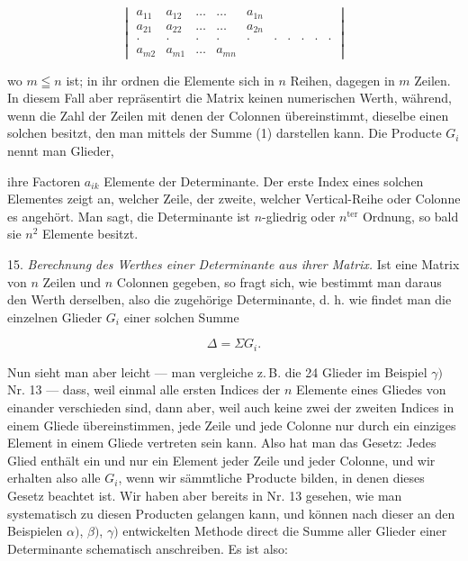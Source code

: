 \documentclass[11pt]{article}
\providecommand{\weberpage}[1]{}
\providecommand{\weq}[2]{\begin{equation}\tag{#1}#2\end{equation}}
\let\Delta\varDelta
\let\Sigma\varSigma
\begin{document}
\[
\begin{vmatrix} a_{11} & a_{12} & \ldots & \ldots & a_{1n} \\ a_{21} & a_{22} & \ldots & \ldots & a_{2n} \\ \cdot & \cdot & \cdot & \cdot & \cdot & \cdot & \cdot & \cdot & \cdot & \cdot \\ a_{m2} & a_{m1} & \ldots & a_{mn} \end{vmatrix}
\]

wo $m \leqq n$ ist; in ihr ordnen die Elemente sich in $n$ Reihen, dagegen in $m$ Zeilen. In diesem Fall aber repräsentirt die Matrix keinen numerischen Werth, während, wenn die Zahl der Zeilen mit denen der Colonnen übereinstimmt, dieselbe einen solchen besitzt, den man mittels der Summe (1) darstellen kann. Die Producte $G_i$ nennt man Glieder,


\weberpage{19}
ihre Factoren $a_{ik}$ Elemente der Determinante. Der erste Index eines solchen Elementes zeigt an, welcher Zeile, der zweite, welcher Vertical-Reihe oder Colonne es angehört. Man sagt, die Determinante ist $n$-gliedrig oder $n^{\text{ter}}$ Ordnung, so bald sie $n^2$ Elemente besitzt.

15. \textit{Berechnung des Werthes einer Determinante aus ihrer Matrix.} Ist eine Matrix von $n$ Zeilen und $n$ Colonnen gegeben, so fragt sich, wie bestimmt man daraus den Werth derselben, also die zugehörige Determinante, d. h. wie findet man die einzelnen Glieder $G_i$ einer solchen Summe

\weq{1}{\Delta = \Sigma G_i.}

Nun sieht man aber leicht — man vergleiche z.\,B. die 24 Glieder im Beispiel $\gamma)$ Nr. 13 — dass, weil einmal alle ersten Indices der $n$ Elemente eines Gliedes von einander verschieden sind, dann aber, weil auch keine zwei der zweiten Indices in einem Gliede übereinstimmen, jede Zeile und jede Colonne nur durch ein einziges Element in einem Gliede vertreten sein kann. Also hat man das Gesetz: Jedes Glied enthält ein und nur ein Element jeder Zeile und jeder Colonne, und wir erhalten also alle $G_i$, wenn wir sämmtliche Producte bilden, in denen dieses Gesetz beachtet ist. Wir haben aber bereits in Nr. 13 gesehen, wie man systematisch zu diesen Producten gelangen kann, und können nach dieser an den Beispielen $\alpha)$, $\beta)$, $\gamma)$ entwickelten Methode direct die Summe aller Glieder einer Determinante schematisch anschreiben. Es ist also:
\end{document}

